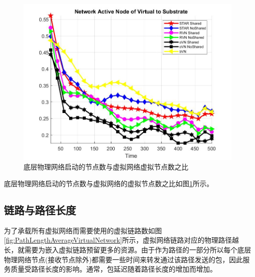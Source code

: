 \begin{figure}[htbp]
\begin{minipage}{0.4\textwidth}
\includegraphics[width=\textwidth]{figures/ActiveNodeSubVir2VirNet}
\caption{底层物理网络启动的节点数与虚拟网络虚拟节点数之比}\label{fig:ActiveNodeSubVir2VirNet}
\end{minipage}\vspace{\baselineskip}
\end{figure}
底层物理网络启动的节点数与虚拟网络的虚拟节点数之比如图\ref{fig:ActiveNodeSubVir2VirNet}所示。


\subsection{链路与路径长度}
为了承载所有虚拟网络而需要使用的虚拟链路数如图\ref{fig:PathLengthAverageVirtualNetwork}所示，虚拟网络链路对应的物理路径越长，就需要为嵌入虚拟链路预留更多的资源。由于作为路径的一部分所以每个底层物理网络节点(接收节点除外)都需要一些时间来转发通过该路径发送的包，因此服务质量受路径长度的影响。通常，包延迟随着路径长度的增加而增加。

